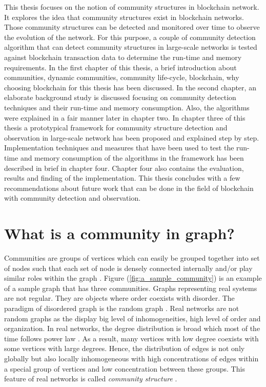This thesis focuses on the notion of community structures in blockchain network. It explores the idea that community structures exist in blockchain networks. Those community structures can be detected and monitored over time to observe the evolution of the network. For this purpose, a couple of community detection algorithm that can detect community structures in large-scale networks is tested against blockchain transaction data to determine the run-time and memory requirements. In the first chapter of this thesis, a brief introduction about communities, dynamic communities, community life-cycle, blockchain, why choosing blockchain for this thesis has been discussed. In the second chapter, an elaborate background study is discussed focusing on community detection techniques and their run-time and memory consumption. Also, the algorithms were explained in a fair manner later in chapter two. In chapter three of this thesis a prototypical framework for community structure detection and observation in large-scale network has been proposed and explained step by step. Implementation techniques and measures that have been used to test the run-time and memory consumption of the algorithms in the framework has been described in brief in chapter four. Chapter four also contains the evaluation, results and finding of the implementation. This thesis concludes with a few recommendations about future work that can be done in the field of blockchain with community detection and observation.

\section{What is a community in graph?}\label{community_in_graph}
Communities are groups of vertices which can easily be grouped together into set of nodes such that each set of node is densely connected internally and/or play similar roles within the graph \cite{ref-6}. Figure (\ref{fig:a_sample_community}) is an example of a sample graph that has three communities. Graphs representing real systems are not regular. They are objects where order coexists with disorder. The paradigm of disordered graph is the random graph \cite{ref-21}. Real networks are not random  graphs as the display big level of inhomogeneities, high level of order and organization. In real networks, the degree distribution is broad which most of the time follows power law \cite{ref-6}. As a result, many vertices with low degree coexists with some vertices with large degrees. Hence, the distribution of edges is not only globally but also locally inhomogeneous with high concentrations of edges within a special group of vertices and low concentration between these groups. This feature of real networks is called \textit{community structure} \cite{ref-1}.

